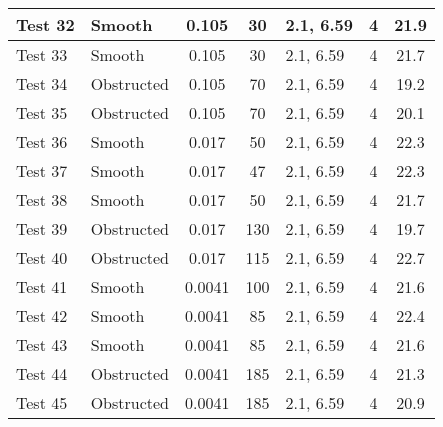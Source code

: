 \begin{table}[!ht]
\begin{center}
\begin {tabular}{|l|l|c|c|l|c|c|}
Test 32    &  Smooth        &  0.105            &  30                 &  2.1, 6.59  &  4              &  21.9                  \\ \hline
Test 33    &  Smooth        &  0.105            &  30                 &  2.1, 6.59  &  4              &  21.7                  \\ \hline
Test 34    &  Obstructed    &  0.105            &  70                 &  2.1, 6.59  &  4              &  19.2                  \\ \hline
Test 35    &  Obstructed    &  0.105            &  70                 &  2.1, 6.59  &  4              &  20.1                  \\ \hline
Test 36    &  Smooth        &  0.017            &  50                 &  2.1, 6.59  &  4              &  22.3                  \\ \hline
Test 37    &  Smooth        &  0.017            &  47                 &  2.1, 6.59  &  4              &  22.3                  \\ \hline
Test 38    &  Smooth        &  0.017            &  50                 &  2.1, 6.59  &  4              &  21.7                  \\ \hline
Test 39    &  Obstructed    &  0.017            &  130                &  2.1, 6.59  &  4              &  19.7                  \\ \hline
Test 40    &  Obstructed    &  0.017            &  115                &  2.1, 6.59  &  4              &  22.7                  \\ \hline
Test 41    &  Smooth        &  0.0041           &  100                &  2.1, 6.59  &  4              &  21.6                  \\ \hline
Test 42    &  Smooth        &  0.0041           &  85                 &  2.1, 6.59  &  4              &  22.4                  \\ \hline
Test 43    &  Smooth        &  0.0041           &  85                 &  2.1, 6.59  &  4              &  21.6                  \\ \hline
Test 44    &  Obstructed    &  0.0041           &  185                &  2.1, 6.59  &  4              &  21.3                  \\ \hline
Test 45    &  Obstructed    &  0.0041           &  185                &  2.1, 6.59  &  4              &  20.9                  \\ \hline
\end{tabular}
\end{center}
\end{table}


